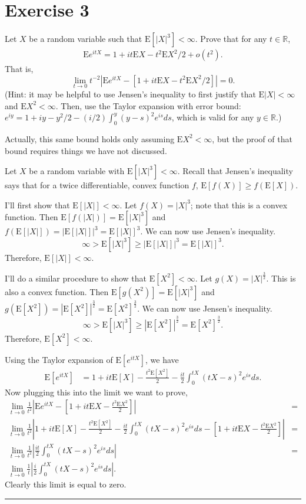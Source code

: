 \documentclass{article}
\theoremstyle{break}
\newenvironment{solution}{{\bf Solution:}}{\hfill\rule{2mm}{2mm}}
\newcommand{\E}{\mathrm{E}}
\newcommand{\R}{\mathbb{R}}
\begin{document}
\section*{Exercise 3}
Let $X$ be a random variable such that $\E[ |X|^{3}] <\infty$.  Prove that for any $t\in\R$,
\begin{align*}
\E e^{itX}=1+it\E X-t^{2}\E X^{2}/2+o(t^{2}).
\end{align*}
That is,
$$\lim_{t \rightarrow 0}t^{-2} |\E e^{itX}-[1+it\E X-t^{2}\E X^{2}/2]|=0.$$
(Hint: it may be helpful to use Jensen's inequality to first justify that $\E |X|<\infty$ and $\E X^{2}<\infty$.  Then, use the Taylor expansion with error bound: $e^{iy}=1+iy-y^{2}/2-(i/2)\int_{0}^{y}(y-s)^{2}e^{is}ds$, which is valid for any $y\in\R$.)

Actually, this same bound holds only assuming $\E X^{2}<\infty$, but the proof of that bound requires things we have not discussed.

\begin{solution}
Let $X$ be a random variable with $\E[|X|^3] < \infty$. Recall that Jensen's inequality says that for a twice differentiable, convex function $f$, $\E[f(X)] \geq f(\E[X])$.

I'll first show that $\E[|X|] < \infty$. Let $f(X) = |X|^3$; note that this is a convex function. 
Then $\E[f(|X|)] = \E[|X|^3]$ and $f(\E[|X|]) = |\E[|X|]|^3 = \E[|X|]^3$. We can now use Jensen's inequality. 
\[ \infty > \E[|X|^3] \geq |\E[|X|]|^3 = \E[|X|]^3.\]
Therefore, $\E[|X|] < \infty$.

I'll do a similar procedure to show that $\E[X^2] < \infty$. Let $g(X) = |X|^\frac{3}{2}$. This is also a convex function. Then $\E[g(X^2)] = \E[|X|^3]$ and $g(\E[X^2]) = |\E[X^2]|^\frac{3}{2} = \E[X^2]^\frac{3}{2}$. We can now use Jensen's inequality. 
\[ \infty > \E[|X|^3] \geq |\E[X^2]|^\frac{3}{2} = \E[X^2]^\frac{3}{2}.\]
Therefore, $\E[X^2] < \infty$.

Using the Taylor expansion of $\E[e^{itX}]$, we have 
\begin{align*}
\E[e^{itX}] &= 1 + it \E[X] - \frac{t^2 \E[X^2]}{2} - \frac{it}{2} \int_0^{tX} (tX - s)^2 e^{is} ds.
\end{align*}
Now plugging this into the limit we want to prove, 
\begin{align*}
\lim_{t \rightarrow 0} \frac{1}{t^2} \left|\E e^{itX}-\left[1+it\E X- \frac{t^{2}\E X^{2}}{2}\right]\right| &= \\
\lim_{t \rightarrow 0} \frac{1}{t^2} \left|1 + it \E[X] - \frac{t^2 \E[X^2]}{2} - \frac{it}{2} \int_0^{tX} (tX - s)^2 e^{is} ds -\left[1+it\E X- \frac{t^{2}\E X^{2}}{2}\right]\right| &= \\
\lim_{t \rightarrow 0} \frac{1}{t^2} \left|\frac{it}{2} \int_0^{tX} (tX - s)^2 e^{is} ds\right| &= \\
\lim_{t \rightarrow 0} \frac{1}{t} \left|\frac{i}{2} \int_0^{tX} (tX - s)^2 e^{is} ds\right|.
\end{align*}
Clearly this limit is equal to zero.
\end{solution}
\end{document}
